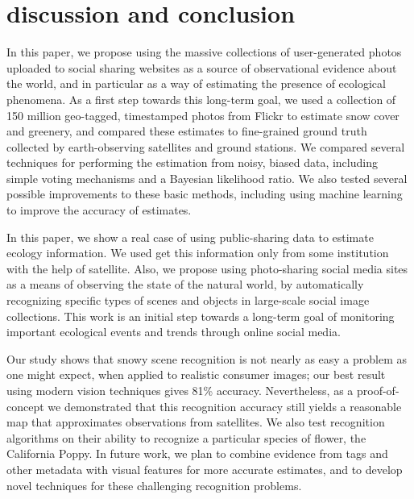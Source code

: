 \section{discussion and conclusion}




In this paper, we propose using the massive collections of
user-generated photos uploaded to social sharing websites as a source
of observational evidence about the world, and in particular as a way
of estimating the presence of ecological phenomena. As a first step
towards this long-term goal, we used a collection of 150 million
geo-tagged, timestamped photos from Flickr to estimate snow 
cover and greenery, and compared these estimates to fine-grained
ground truth collected by earth-observing satellites and ground stations. We compared
several techniques for performing the estimation from noisy, biased
data, including simple voting mechanisms and a Bayesian likelihood
ratio. We also tested several possible improvements to these basic
methods, including using 
machine learning to improve the accuracy of estimates.

In this paper, we show a real case of using public-sharing data to estimate ecology information.
We used get this information only from some institution with the help of satellite.
Also, we propose using photo-sharing social media sites as a
means of observing the state of the natural world, by automatically
recognizing specific types of scenes and objects in large-scale social
image collections. This work is an initial step towards a long-term
goal of monitoring important ecological events and trends through
online social media.  




Our study shows that snowy scene recognition is
not nearly as easy a problem as one might expect, when applied to realistic
consumer images; our best result using
modern vision techniques gives 81\% accuracy. Nevertheless, as a proof-of-concept
we demonstrated that this recognition accuracy still yields a reasonable
map that approximates observations from satellites.
We also test recognition algorithms on their ability to recognize a
particular species of flower, the California Poppy. In future work, we
plan to combine evidence from tags and other metadata with visual
features for more accurate estimates, and to develop novel techniques
for these challenging recognition problems. 

